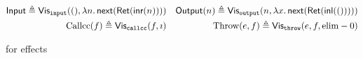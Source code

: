 \begin{figure}
  \begin{align*}
    \INPUT \eqdef \Vis_{\mathtt{input}}((), \Lam n. \Next(\Rret(\inr(n)))) && \OUTPUT(n) \eqdef \Vis_{\mathtt{output}}(n, \Lam x. \Next (\Rret(\inl(())))) \\
    \callccGT(f) \eqdef \Vis_{\mathtt{callcc}}{(f, \imath)} &&
                                                                                                                              \throwGT(e, f) \eqdef \Vis_{\mathtt{throw}}{(e, f, \mathrm{elim-0})}
  \end{align*}
  \caption{\gitrees for effects}
  \label{fig:io_constructors}
\end{figure}

